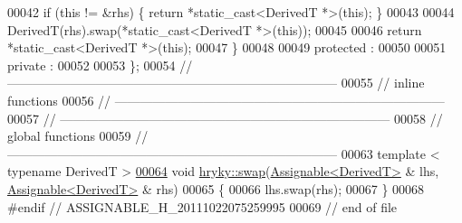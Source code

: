 \begin{DoxyCode}
00042         \textcolor{keywordflow}{if} (\textcolor{keyword}{this} != &rhs) \{ \textcolor{keywordflow}{return} *\textcolor{keyword}{static\_cast<}DerivedT *\textcolor{keyword}{>}(\textcolor{keyword}{this}); \}
00043 
00044         DerivedT(rhs).swap(*static\_cast<DerivedT *>(\textcolor{keyword}{this}));
00045         
00046         \textcolor{keywordflow}{return} *\textcolor{keyword}{static\_cast<}DerivedT *\textcolor{keyword}{>}(\textcolor{keyword}{this});
00047     \}
00048 
00049 \textcolor{keyword}{protected} :
00050 
00051 \textcolor{keyword}{private} :
00052 
00053 \};
00054 \textcolor{comment}{//
      ------------------------------------------------------------------------------}
00055 \textcolor{comment}{// inline functions}
00056 \textcolor{comment}{//
      ------------------------------------------------------------------------------}
00057 \textcolor{comment}{//
      ------------------------------------------------------------------------------}
00058 \textcolor{comment}{// global functions}
00059 \textcolor{comment}{//
      ------------------------------------------------------------------------------}
00063 \textcolor{comment}{}\textcolor{keyword}{template} < \textcolor{keyword}{typename} DerivedT >
\hypertarget{assignable_8h_source_l00064}{}\hyperlink{namespacehryky_ac0680d4816412ad35d571975809cccb2}{00064} \textcolor{keywordtype}{void} \hyperlink{namespacehryky_a4282146df5ea2b68cb667896a2205909}{hryky::swap}(\hyperlink{classhryky_1_1_assignable}{Assignable<DerivedT>} & lhs, \hyperlink{classhryky_1_1_assignable}{Assignable<DerivedT>} & rhs)
00065 \{
00066     lhs.swap(rhs);
00067 \}
00068 \textcolor{preprocessor}{#endif // ASSIGNABLE\_H\_20111022075259995}
00069 \textcolor{preprocessor}{}\textcolor{comment}{// end of file}
\end{DoxyCode}
